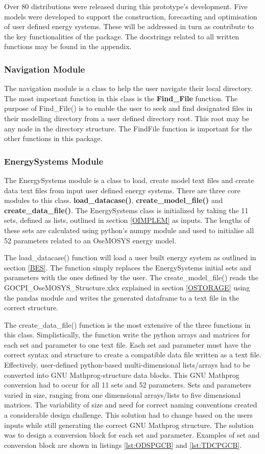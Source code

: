 \documentclass[12pt]{article}
\begin{document}
Over 80 distributions were released during this prototype's development. 
Five models were developed to support the construction, forecasting and optimisation of user defined energy systems.
These will be addressed in turn as contribute to the key functionalities of the package.
The docstrings related to all written functions may be found in the appendix.

\subsubsection{Navigation Module}
The navigation module is a class to help the user navigate their local directory. 
The most important function in this class is the \textbf{Find\_File} function.
The purpose of Find\_File() is to enable the user to seek and find designated files in their modelling directory from a user defined directory root.
This root may be any node in the directory structure. 
The FindFile function is important for the other functions in this package.

\subsubsection{EnergySystems Module}
The EnergySystems module is a class to load, create model text files and create data text files from input user defined energy systems. 
There are three core modules to this class. \textbf{load\_datacase()}, \textbf{create\_model\_file()} and \textbf{create\_data\_file()}.
The EnergySystems class is initialized by taking the 11 sets, defined as lists, outlined in section \ref{OIMPLEM} as inputs. 
The lengths of these sets are calculated using python's numpy module and used to initialise all 52 parameters related to an OseMOSYS energy model.

The load\_datacase() function will load a user built energy system as outlined in section \ref{BES}. 
The function simply replaces the EnergySystems initial sets and parameters with the ones defined by the user.
The create\_model\_file() reads the GOCPI\_OseMOSYS\_Structure.xlsx explained in section \ref{OSTORAGE} using the pandas module and writes the generated dataframe to a text file in the correct structure.

The create\_data\_file() function is the most extensive of the three functions in this class.
Simplistically, the function write the python arrays and matrices for each set and parameter to one text file.
Each set and parameter must have the correct syntax and structure to create a compatible data file written as a text file.
Effectively, user-defined python-based multi-dimensional lists/arrays had to be converted into GNU Mathprog-structure data blocks.
This GNU Mathprog conversion had to occur for all 11 sets and 52 parameters.
Sets and parameters varied in size, ranging from one dimensional arrays/lists to five dimensional matrices.
The variability of size and need for correct naming conventions created a considerable design challenge.
This solution had to change based on the users inputs while still generating the correct GNU Mathprog structure.
The solution was to design a conversion block for each set and parameter. 
Examples of set and conversion block are shown in listings \ref{lst:ODSPGCB} and \ref{lst:TDCPGCB}.
\end{document}
